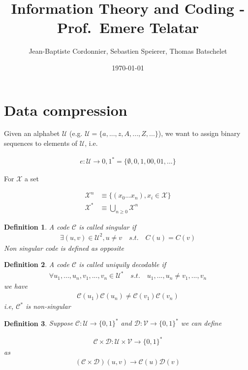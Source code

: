 \documentclass{article}
\title{Information Theory and Coding - Prof.~Emere Telatar}
\date{\today}
\author{Jean-Baptiste Cordonnier, Sebastien Speierer, Thomas Batschelet}
\newtheorem{definition}{Definition}[section]
\def\D{\mathcal{D}}
\def\V{\mathcal{V}}
\def\U{\mathcal{U}}
\def\X{\mathcal{X}}
\def\C{\mathcal{C}}
\begin{document}
\maketitle


\section{Data compression}

Given an alphabet $\U$ (e.g. $\U = \{a, ..., z, A, ..., Z, ...\}$), we want to assign binary sequences to elements of $\U$, i.e.

\begin{align*}
	e: \U \rightarrow {0, 1}^* = \{\emptyset, 0, 1, 00, 01, ...\}
\end{align*}

For $\X$ a set

\begin{align*}
	\X^n &\equiv \{ (x_0 ... x_n), x_i \in \X\} \\
	\X^* &\equiv \bigcup_{n \geq 0} \X^n
\end{align*}

\begin{definition}
	A code $\C$ is called \textit{singular} if
	\begin{align*}
		\exists (u, v) \in \U^2, u \neq v \quad s.t. \quad C(u) = C(v)
	\end{align*}
	Non singular code is defined as opposite
\end{definition}

\begin{definition}
	A code $\C$ is called \textit{uniquily decodable} if
	\begin{align*}
		\forall u_1,...,u_n,v_1,...,v_n \in \U^* \quad s.t. \quad u_1,...,u_n \neq v_1,...,v_n
	\end{align*}
	we have
	\begin{align*}
		\C(u_1) \C(u_n) \neq \C(v_1) \C(v_n)
	\end{align*}
	i.e, $\C^*$ is non-singular
\end{definition}

\begin{definition}
	Suppose $\C : \U \rightarrow \{ 0, 1\}^*$ and $\D : \V \rightarrow \{ 0, 1\}^*$ we can define

	\begin{align*}
		\C \times \D : \U \times \V \rightarrow \{0, 1\}^*
	\end{align*}
	as
	\begin{align*}
		(\C \times \D)(u, v) \rightarrow \C(u)\D(v)
	\end{align*}
\end{definition}
\end{document}
